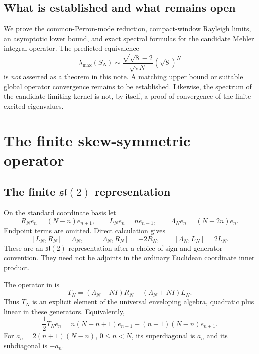 \documentclass[11pt,reqno]{amsart}
\theoremstyle{definition}\newtheorem{definition}[theorem]{Definition}
\theoremstyle{remark}\newtheorem{remark}[theorem]{Remark}
\begin{document}
\subsection*{What is established and what remains open}
We prove the common-Perron-mode reduction, compact-window Rayleigh
limits, an asymptotic lower bound, and exact spectral formulas for the
candidate Mehler integral operator. The predicted equivalence
\begin{equation}\label{eq:predicted-asymptotic}
\lambda_{\max}(S_N)\sim
\frac{\sqrt{\sqrt8-2}}{\sqrt{\pi N}}(\sqrt8)^N
\end{equation}
is \emph{not} asserted as a theorem in this note. A matching upper bound
or suitable global operator convergence remains to be established.
Likewise, the spectrum of the candidate limiting kernel is not, by
itself, a proof of convergence of the finite excited eigenvalues.

\section{The finite skew-symmetric operator}
\subsection{The finite $\mathfrak{sl}(2)$ representation}
On the standard coordinate basis let
\[
R_Ne_n=(N-n)e_{n+1},\qquad L_Ne_n=ne_{n-1},\qquad
\Lambda_Ne_n=(N-2n)e_n.
\]
Endpoint terms are omitted. Direct calculation gives
\begin{equation}\label{eq:finite-sl2}
[L_N,R_N]=\Lambda_N,\qquad
[\Lambda_N,R_N]=-2R_N,\qquad
[\Lambda_N,L_N]=2L_N.
\end{equation}
These are an $\mathfrak{sl}(2)$ representation after a choice of sign
and generator convention. They need not be adjoints in the ordinary
Euclidean coordinate inner product.

The operator in \cite{FF} is
\begin{equation}\label{eq:T-enveloping}
T_N=(\Lambda_N-NI)R_N+(\Lambda_N+NI)L_N.
\end{equation}
Thus $T_N$ is an explicit element of the universal enveloping algebra,
quadratic plus linear in these generators. Equivalently,
\begin{equation}\label{eq:T-action}
\frac12T_Ne_n=n(N-n+1)e_{n-1}-(n+1)(N-n)e_{n+1}.
\end{equation}
For $a_n=2(n+1)(N-n)$, $0\le n<N$, its superdiagonal is $a_n$
and its subdiagonal is $-a_n$.
\end{document}
